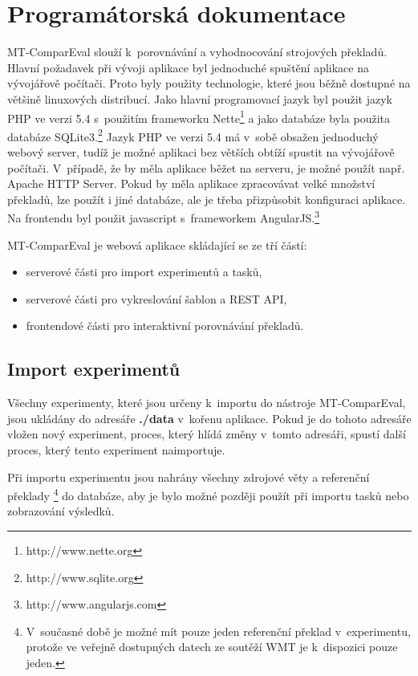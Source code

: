 \chapter{Programátorská dokumentace}
\label{chap:programmers}


\mbox{MT-ComparEval} slouží k~porovnávání a vyhodnocování strojových překladů.
Hlavní požadavek při vývoji aplikace byl jednoduché spuštění aplikace na vývojářově počítači.
Proto byly použity technologie,
  které jsou běžně dostupné na většině linuxových distribucí.
Jako hlavní programovací jazyk byl použit jazyk PHP ve verzi 5.4 
  s~použitím frameworku Nette\footnote{http://www.nette.org}
  a jako databáze byla použita databáze SQLite3.\footnote{http://www.sqlite.org}
Jazyk PHP ve verzi 5.4 má v~sobě obsažen jednoduchý webový server,
  tudíž je možné aplikaci bez větších obtíží spustit na vývojářově počítači.
V~případě, že by měla aplikace běžet na serveru,
  je možné použít např. Apache HTTP Server.
Pokud by měla aplikace zpracovávat velké množství překladů,
  lze použít i jiné databáze,
  ale je třeba přizpůsobit konfiguraci aplikace.
Na frontendu byl použit javascript s~frameworkem AngularJS.\footnote{http://www.angularjs.com}

\mbox{MT-ComparEval} je webová aplikace skládající se ze tří částí:
\begin{itemize}
	\item serverové části pro import experimentů a tasků,
	\item serverové části pro vykreslování šablon a REST API,
	\item frontendové části pro interaktivní porovnávání překladů.
\end{itemize}

\section{Import experimentů}
Všechny experimenty, které jsou určeny k~importu do nástroje \mbox{MT-ComparEval},
  jsou ukládány do adresáře \textbf{./data} v~kořenu aplikace.
Pokud je do tohoto adresáře vložen nový experiment,
  proces, který hlídá změny v~tomto adresáři,
  spustí další proces, který tento experiment naimportuje.

Při importu experimentu jsou nahrány všechny zdrojové věty
  a referenční překlady \footnote{
	V~současné době je možné mít pouze jeden referenční překlad v~experimentu,
	protože ve veřejně dostupných datech ze soutěží WMT je k~dispozici pouze jeden. }
  do databáze,
  aby je bylo možné později použít při importu tasků
  nebo zobrazování výsledků.

